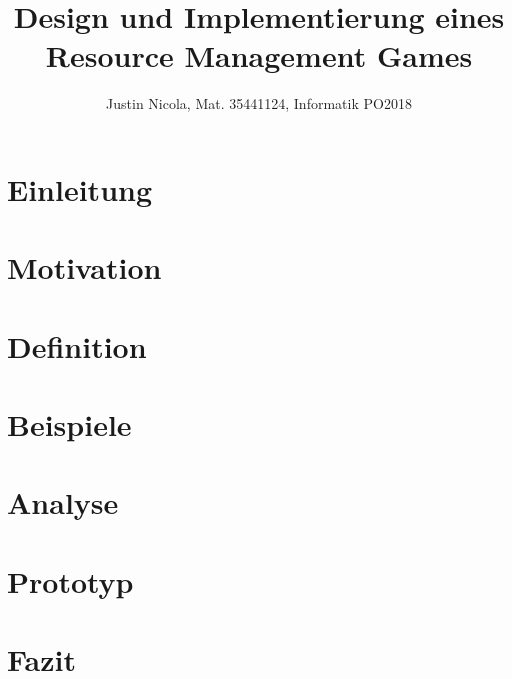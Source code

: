 \documentclass{article}
\title{Design und Implementierung eines Resource Management Games}
\author{Justin Nicola, Mat. 35441124, Informatik PO2018}
\begin{document}






\maketitle
\section{Einleitung}


\section{Motivation}


\section{Definition}


\section{Beispiele}


\section{Analyse}


\section{Prototyp}


\section{Fazit}


\newpage
\printbibliography

\newpage

\end{document}
